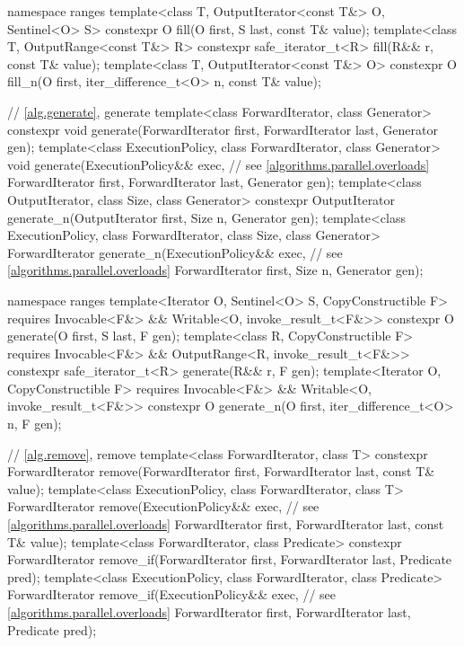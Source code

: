 \begin{codeblock}
{  namespace ranges {
    template<class T, OutputIterator<const T&> O, Sentinel<O> S>
      constexpr O fill(O first, S last, const T& value);
    template<class T, OutputRange<const T&> R>
      constexpr safe_iterator_t<R> fill(R&& r, const T& value);
    template<class T, OutputIterator<const T&> O>
      constexpr O fill_n(O first, iter_difference_t<O> n, const T& value);
  }

  // \ref{alg.generate}, generate
  template<class ForwardIterator, class Generator>
    constexpr void generate(ForwardIterator first, ForwardIterator last,
                            Generator gen);
  template<class ExecutionPolicy, class ForwardIterator, class Generator>
    void generate(ExecutionPolicy&& exec, // see \ref{algorithms.parallel.overloads}
                  ForwardIterator first, ForwardIterator last,
                  Generator gen);
  template<class OutputIterator, class Size, class Generator>
    constexpr OutputIterator generate_n(OutputIterator first, Size n, Generator gen);
  template<class ExecutionPolicy, class ForwardIterator, class Size, class Generator>
    ForwardIterator generate_n(ExecutionPolicy&& exec, // see \ref{algorithms.parallel.overloads}
                               ForwardIterator first, Size n, Generator gen);

  namespace ranges {
    template<Iterator O, Sentinel<O> S, CopyConstructible F>
      requires Invocable<F&> && Writable<O, invoke_result_t<F&>>
      constexpr O generate(O first, S last, F gen);
    template<class R, CopyConstructible F>
      requires Invocable<F&> && OutputRange<R, invoke_result_t<F&>>
      constexpr safe_iterator_t<R> generate(R&& r, F gen);
    template<Iterator O, CopyConstructible F>
      requires Invocable<F&> && Writable<O, invoke_result_t<F&>>
      constexpr O generate_n(O first, iter_difference_t<O> n, F gen);
  }

  // \ref{alg.remove}, remove
  template<class ForwardIterator, class T>
    constexpr ForwardIterator remove(ForwardIterator first, ForwardIterator last,
                                     const T& value);
  template<class ExecutionPolicy, class ForwardIterator, class T>
    ForwardIterator remove(ExecutionPolicy&& exec, // see \ref{algorithms.parallel.overloads}
                           ForwardIterator first, ForwardIterator last,
                           const T& value);
  template<class ForwardIterator, class Predicate>
    constexpr ForwardIterator remove_if(ForwardIterator first, ForwardIterator last,
                                        Predicate pred);
  template<class ExecutionPolicy, class ForwardIterator, class Predicate>
    ForwardIterator remove_if(ExecutionPolicy&& exec, // see \ref{algorithms.parallel.overloads}
                              ForwardIterator first, ForwardIterator last,
                              Predicate pred);

}
\end{codeblock}
